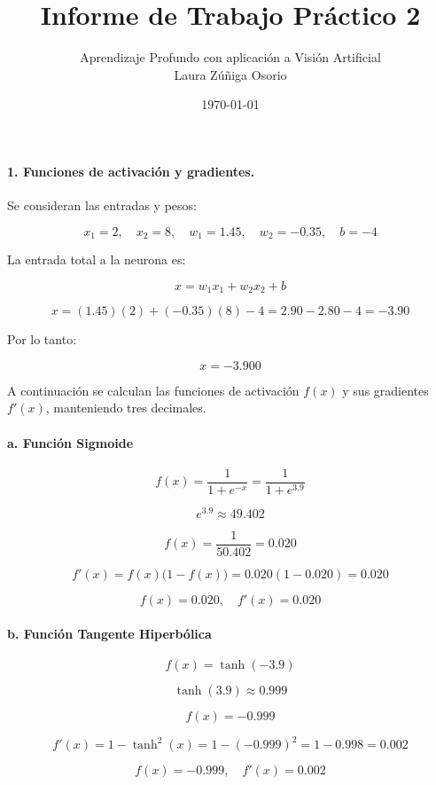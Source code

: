 \documentclass[a4paper,12pt]{article}
\title{Informe de Trabajo Práctico 2}
\author{Aprendizaje Profundo con aplicación a Visión Artificial \\
Laura Zúñiga Osorio}
\date{\today}
\begin{document}
\maketitle
\paragraph{1. Funciones de activación y gradientes.}

Se consideran las entradas y pesos:

\[
x_1 = 2, \quad x_2 = 8, \quad w_1 = 1.45, \quad w_2 = -0.35, \quad b = -4
\]

La entrada total a la neurona es:

\[
x = w_1 x_1 + w_2 x_2 + b
\]

\[
x = (1.45)(2) + (-0.35)(8) - 4 = 2.90 - 2.80 - 4 = -3.90
\]

Por lo tanto:

\[
\boxed{x = -3.900}
\]

A continuación se calculan las funciones de activación $f(x)$ y sus gradientes $f'(x)$, manteniendo tres decimales.

\paragraph{a. Función Sigmoide}

\[
f(x) = \frac{1}{1 + e^{-x}} = \frac{1}{1 + e^{3.9}}
\]

\[
e^{3.9} \approx 49.402
\]

\[
f(x) = \frac{1}{50.402} = 0.020
\]

\[
f'(x) = f(x)\big(1 - f(x)\big) = 0.020(1 - 0.020) = 0.020
\]

\[
\boxed{f(x) = 0.020, \quad f'(x) = 0.020}
\]

\paragraph{b. Función Tangente Hiperbólica}

\[
f(x) = \tanh(-3.9)
\]

\[
\tanh(3.9) \approx 0.999
\]

\[
f(x) = -0.999
\]

\[
f'(x) = 1 - \tanh^2(x) = 1 - (-0.999)^2 = 1 - 0.998 = 0.002
\]

\[
\boxed{f(x) = -0.999, \quad f'(x) = 0.002}
\]

\end{document}
